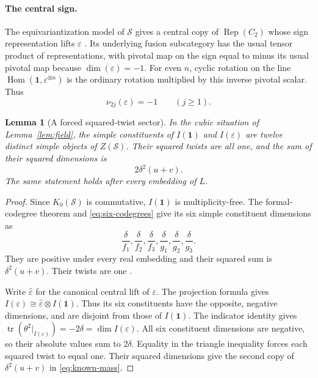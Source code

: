 \documentclass[11pt,a4paper]{article}
\newtheorem{lemma}[theorem]{Lemma}
\theoremstyle{definition}
\theoremstyle{remark}
\newcommand{\cS}{\mathcal S}
\newcommand{\one}{\mathbf 1}
\newcommand{\eps}{\varepsilon}
\newcommand{\tr}{\operatorname{tr}}
\newcommand{\Rep}{\operatorname{Rep}}
\newcommand{\Hom}{\operatorname{Hom}}
\numberwithin{equation}{section}
\begin{document}
\paragraph{The central sign.}
The equivariantization model of $\cS$ gives a central copy of
$\Rep(C_2)$ whose sign representation lifts $\eps$
\cite[Definition~5.13 and Corollary~5.15]{Bartlett}. Its underlying
fusion subcategory has the usual tensor product of representations,
with pivotal map on the sign equal to minus its usual pivotal map
because $\dim(\eps)=-1$. For even $n$, cyclic rotation on the line
$\Hom(\one,\eps^{\otimes n})$ is the ordinary rotation multiplied
by this inverse pivotal scalar. Thus
\begin{equation}\label{eq:eps-ind}
  \nu_{2j}(\eps)=-1\qquad(j\geq1).
\end{equation}

\begin{lemma}[A forced squared-twist sector]\label{lem:sector}
In the cubic situation of Lemma~\ref{lem:field}, the simple constituents of $I(\one)$ and $I(\eps)$ are twelve distinct simple objects of $Z(\cS)$. Their squared twists are all one, and the sum of their squared dimensions is
\begin{equation}\label{eq:known-mass}
 2\delta^2(u+v).
\end{equation}
The same statement holds after every embedding of $L$.
\end{lemma}
\begin{proof}
Since $K_0(\cS)$ is commutative, $I(\one)$ is multiplicity-free. The formal-codegree theorem \cite[Theorem~2.13]{Ostrik} and \eqref{eq:six-codegrees} give its six simple constituent dimensions as
\[
 \frac{\delta}{f_1},\frac{\delta}{f_2},\frac{\delta}{f_3},
 \frac{\delta}{g_1},\frac{\delta}{g_2},\frac{\delta}{g_3}.
\]
They are positive under every real embedding and their squared sum is $\delta^2(u+v)$. Their twists are one \cite[Theorem~2.5]{Ostrik}.

Write $\widehat\eps$ for the canonical central lift of $\eps$. The projection formula gives $I(\eps)\cong\widehat\eps\otimes I(\one)$. Thus its six constituents have the opposite, negative dimensions, and are disjoint from those of $I(\one)$. The indicator identity gives
$\tr(\theta^2|_{I(\eps)})=-2\delta=\dim I(\eps)$.
All six constituent dimensions are negative, so their absolute values
sum to $2\delta$. Equality in the triangle inequality forces each
squared twist to equal one. Their squared dimensions give the second
copy of $\delta^2(u+v)$ in \eqref{eq:known-mass}.
\end{proof}
\end{document}
